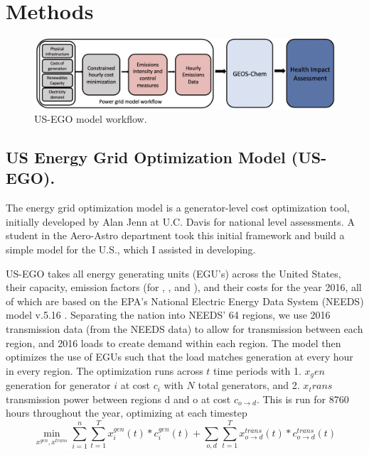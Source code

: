 \documentclass[12]{article}
\begin{document}
\section{Methods}

\begin{figure}[!htb]
    \centering 
    \includegraphics[scale = .5]{US_EGO_flow.png}
    \caption{US-EGO model workflow.}
    \label{fig:my_label}
\end{figure}

\subsection{US Energy Grid Optimization Model (US-EGO).}
The energy grid optimization model is a generator-level cost optimization tool, initially developed by Alan Jenn at U.C. Davis for national level assessments. A student in the Aero-Astro department took this initial framework and build a simple model for the U.S., which I assisted in developing.  

US-EGO takes all energy generating units (EGU's) across the United States, their capacity, emission factors (for , , and ), and their costs for the year 2016, all of which are based on the EPA's National Electric Energy Data System (NEEDS) model v.5.16 \citep{epa_power_2016}. Separating the nation into NEEDS' 64 regions, we use 2016 transmission data (from the NEEDS data) to allow for transmission between each region, and 2016 loads to create demand within each region. The model then optimizes the use of EGUs such that the load matches generation at every hour in every region. The optimization runs across $t$ time periods with 1. $x_gen$ generation for generator $i$ at cost $c_i$ with $N$ total generators, and 2. $x_trans$ transmission power between regions d and o at cost $c_{o\rightarrow{}d}$. This is run for 8760 hours throughout the year, optimizing at each timestep \citep{jenn_future_2018}
\begin{equation}
    \min\limits_{x^{gen}, x^{trans}}\sum_{i=1}^{n}\sum_{t=1}^{T} x^{gen}_{i}(t)*c^{gen}_{i}(t) + \sum_{o,d}\sum_{t=1}^{T} x^{trans}_{o\rightarrow{}d}(t)*c^{trans}_{o\rightarrow{}d}(t)
\end{equation}
\end{document}

